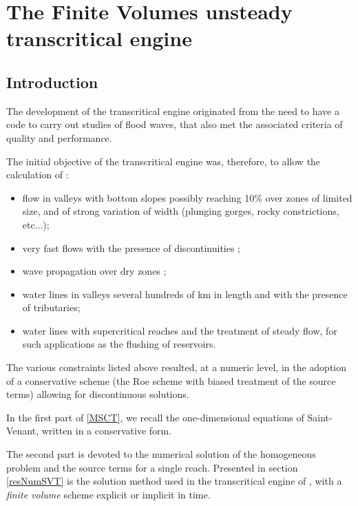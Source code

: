 \chapter{The Finite Volumes unsteady transcritical engine \mascaret{}}
\label{Chapter3}

\section{Introduction}

The development of the transcritical engine originated from the need to have a code to carry out studies of flood waves, that also met the associated criteria of quality and performance.

The initial objective of the transcritical engine was, therefore, to allow the calculation of :
\begin{itemize}
 \item flow in valleys with bottom slopes possibly reaching 10\% over zones of limited size, and of strong variation of width (plunging gorges, rocky constrictions, etc...);
 \item very fast flows with the presence of discontinuities ;
 \item wave propagation over dry zones ;
 \item water lines in valleys several hundreds of km in length and with the presence of tributaries;
 \item water lines with supercritical reaches and the treatment of steady flow, for such applications as the flushing of reservoirs.
\end{itemize}

The various constraints listed above resulted, at a numeric level, in the adoption of a conservative scheme (the Roe scheme with biased treatment of the source terms) allowing for discontinuous solutions.

In the first part of \ref{MSCT}, we recall the one-dimensional equations of Saint-Venant, written in a conservative form.

The second part is devoted to the numerical solution of the homogeneous problem and the source terms for a single reach. Presented in section \ref{resNumSVT} is the solution method used in the transcritical engine of \mascaret{}, with a \textit{finite volume} scheme explicit or implicit in time.

